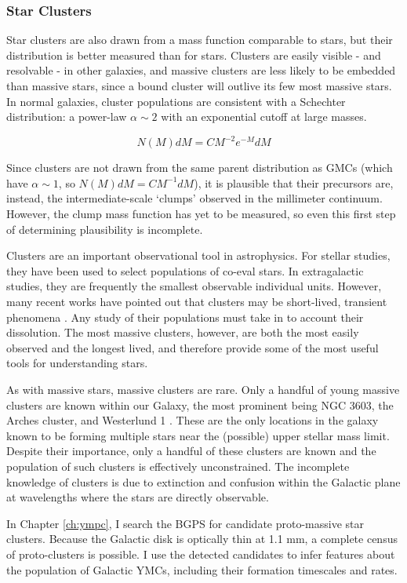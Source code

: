\subsubsection{Star Clusters}
Star clusters are also drawn from a mass function comparable to stars, but
their distribution is better measured than for stars.  Clusters are
easily visible - and resolvable - in other galaxies, and massive clusters are
less likely to be embedded than massive stars, since a bound cluster will outlive its few most
massive stars.  In normal galaxies, cluster
populations are consistent with a Schechter distribution: a power-law
$\alpha\sim2$ with an exponential cutoff at large masses.

$$N(M)dM = C M^{-2} e^{-M} dM$$

Since clusters are not drawn from the same parent distribution as GMCs (which
have $\alpha\sim1$, so $N(M) dM = C M^{-1} dM$), it is plausible that their
precursors are, instead, the intermediate-scale `clumps' observed in the
millimeter continuum.  However, the clump mass function has yet to be measured,
so even this first step of determining plausibility is incomplete.

Clusters are an important observational tool in astrophysics.  For stellar
studies, they have been used to select populations of co-eval stars.  In
extragalactic studies, they are frequently the smallest observable individual
units.  However, many recent works have pointed out that clusters may be
short-lived, transient phenomena
\citep{Kruijssen2011a,Whitehead2013a,Gieles2011a,Whitmore2009a}.  Any study of
their populations must take in to account their dissolution.  The most massive
clusters, however, are both the most easily observed and the longest lived, and
therefore provide some of the most useful tools for understanding stars.

As with massive stars, massive clusters are rare.  Only a handful of young
massive clusters are known within our Galaxy, the most prominent being NGC
3603, the Arches cluster, and Westerlund 1 \citep{PortegiesZwart2010}.  These
are the only locations in the galaxy known to be forming multiple stars near
the (possible) upper stellar mass limit.  Despite their importance, 
only a handful of these clusters are known and the population of such clusters
is effectively unconstrained.  The incomplete knowledge of clusters is due to
extinction and confusion within the Galactic plane at wavelengths where
the stars are directly observable.

In Chapter \ref{ch:ympc}, I search the BGPS for candidate proto-massive star
clusters.  Because the Galactic disk is optically thin at 1.1 mm, a complete
census of proto-clusters is possible.  I use the detected candidates to infer
features about the population of Galactic YMCs, including their formation
timescales and rates.

